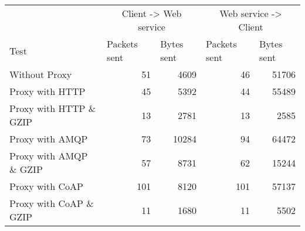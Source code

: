 \begin{tabular}{lrrrr}
\hline
\multicolumn{1}{l}{}                  & \multicolumn{2}{c}{Client -> Web service}                           & \multicolumn{2}{c}{Web service -> Client}                           \\
\multicolumn{1}{l}{Test} & \multicolumn{1}{l}{Packets sent} & \multicolumn{1}{l}{Bytes sent} & \multicolumn{1}{l}{Packets sent} & \multicolumn{1}{l}{Bytes sent} \\ \hline
Without Proxy                   & 51             & 4609           & 46             & 51706          \\
Proxy with HTTP                 & 45             & 5392           & 44             & 55489          \\
Proxy with HTTP \& GZIP         & 13             & 2781           & 13             & 2585           \\
Proxy with AMQP                 & 73             & 10284          & 94             & 64472          \\
Proxy with AMQP \& GZIP         & 57             & 8731           & 62             & 15244          \\
Proxy with CoAP                 & 101            & 8120           & 101            & 57137          \\
Proxy with CoAP \& GZIP         & 11             & 1680           & 11             & 5502           \\
\end{tabular}
